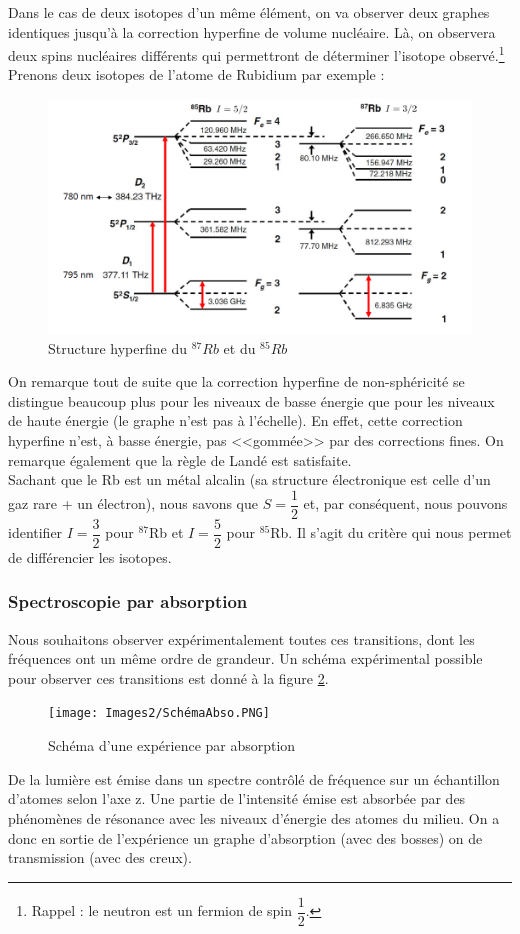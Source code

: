 Dans le cas de deux isotopes d'un même élément, on va observer deux graphes identiques jusqu'à la correction hyperfine de volume nucléaire. Là, on observera deux spins nucléaires différents qui permettront de déterminer l'isotope observé.\footnote{Rappel : le neutron est un fermion de spin $\dfrac{1}{2}$.} Prenons deux isotopes de l'atome de Rubidium par exemple :
\begin{figure}[htp]
    \centering
    \includegraphics[scale=0.8]{Images2/ComparaisonRb.PNG}
    \caption{Structure hyperfine du $^{87}Rb$ et du $^{85}Rb$}
\label{eq:struct_hyperfine}
\end{figure}
On remarque tout de suite que la correction hyperfine de non-sphéricité se distingue beaucoup plus pour les niveaux de basse énergie que pour les niveaux de haute énergie (le graphe n'est pas à l'échelle). En effet, cette correction hyperfine n'est, à basse énergie, pas <<gommée>> par des corrections fines. On remarque également que la règle de Landé est satisfaite.\\
Sachant que le Rb est un métal alcalin (sa structure électronique est celle d'un gaz rare + un électron), nous savons que $S = \dfrac{1}{2}$ et, par conséquent, nous pouvons identifier $I = \dfrac{3}{2}$ pour $^{87}$Rb et $I = \dfrac{5}{2}$ pour $^{85}$Rb. Il s'agit du critère qui nous permet de différencier les isotopes.



\subsubsection{Spectroscopie par absorption}


Nous souhaitons observer expérimentalement toutes ces transitions, dont les fréquences ont un même ordre de grandeur. Un schéma expérimental possible pour observer ces transitions est donné à la figure \ref{fig:SchemaAbso}.
\begin{figure}[htp]
    \centering
    \texttt{[image: Images2/SchémaAbso.PNG]}
    \caption{Schéma d'une expérience par absorption}
    \label{fig:SchemaAbso}
\end{figure}
De la lumière est émise dans un spectre contrôlé de fréquence sur un échantillon d'atomes selon l'axe z. Une partie de l'intensité émise est absorbée par des phénomènes de résonance avec les niveaux d'énergie des atomes du milieu. On a donc en sortie de l'expérience un graphe d'absorption (avec des bosses) on de transmission (avec des creux).\\

